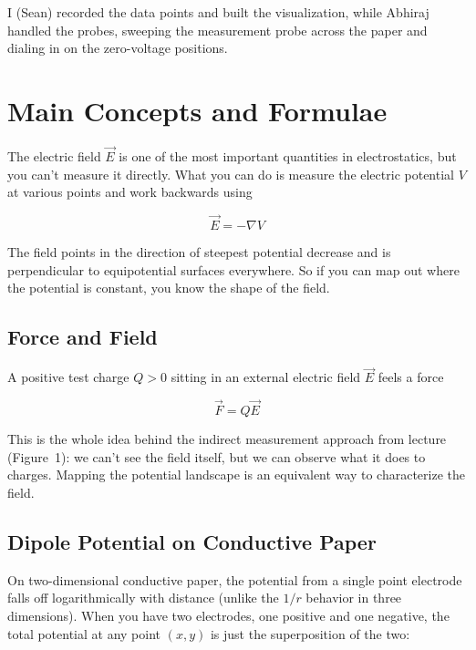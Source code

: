 \documentclass[12pt]{article}
\begin{document}
I (Sean) recorded the data points and built the visualization, while Abhiraj handled the probes, sweeping the measurement probe across the paper and dialing in on the zero-voltage positions.

\section{Main Concepts and Formulae}

The electric field $\vec{E}$ is one of the most important quantities in electrostatics, but you can't measure it directly. What you can do is measure the electric potential $V$ at various points and work backwards using

\begin{equation}
    \vec{E} = -\nabla V
\end{equation}

The field points in the direction of steepest potential decrease and is perpendicular to equipotential surfaces everywhere. So if you can map out where the potential is constant, you know the shape of the field.

\subsection{Force and Field}

A positive test charge $Q > 0$ sitting in an external electric field $\vec{E}$ feels a force

\begin{equation}
    \vec{F} = Q\vec{E}
\end{equation}

This is the whole idea behind the indirect measurement approach from lecture (Figure~1): we can't see the field itself, but we can observe what it does to charges. Mapping the potential landscape is an equivalent way to characterize the field.

\subsection{Dipole Potential on Conductive Paper}

On two-dimensional conductive paper, the potential from a single point electrode falls off logarithmically with distance (unlike the $1/r$ behavior in three dimensions). When you have two electrodes, one positive and one negative, the total potential at any point $(x, y)$ is just the superposition of the two:
\end{document}
